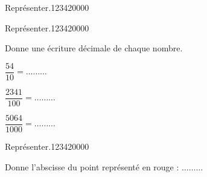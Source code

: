 \begin{pageParcoursu}
\begin{ExoCu}{Représenter.}{1234}{2}{0}{0}{0}{0}
\end{ExoCu}

\begin{ExoCu}{Représenter.}{1234}{2}{0}{0}{0}{0}


Donne une écriture décimale de chaque nombre. 

\begin{minipage}{0.32\linewidth}
 $\dfrac{54}{10} =  \ldots\ldots\ldots$ 
\end{minipage}
\begin{minipage}{0.32\linewidth}
$\dfrac{2341}{100} =  \ldots\ldots\ldots$  
\end{minipage}
\begin{minipage}{0.32\linewidth}
$\dfrac{5064}{1000} =  \ldots\ldots\ldots$   
\end{minipage}
 
\end{ExoCu}

\begin{ExoCu}{Représenter.}{1234}{2}{0}{0}{0}{0}

 
Donne l'abscisse du point représenté en rouge :  $\ldots\ldots\ldots$
 

\end{ExoCu}
\end{pageParcoursu}
